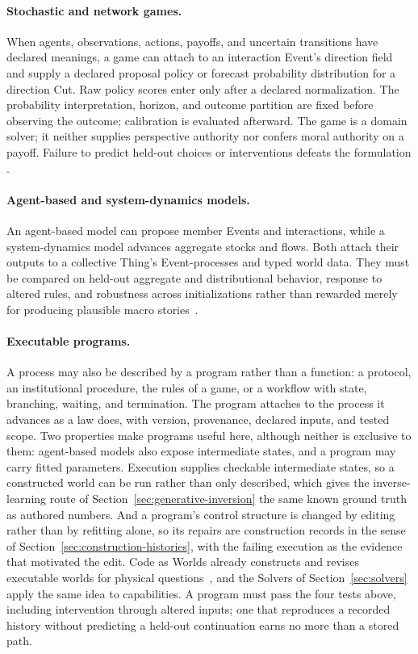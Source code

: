 \documentclass[10pt]{article}
\begin{document}
\paragraph{Stochastic and network games.}
When agents, observations, actions, payoffs, and uncertain transitions have
declared meanings, a game can attach to an interaction Event's direction field
and supply a declared proposal policy or forecast probability distribution for
a direction Cut. Raw policy scores enter only after a declared normalization.
The probability interpretation, horizon, and outcome partition are fixed
before observing the outcome; calibration is evaluated afterward. The game is a domain solver; it neither supplies perspective authority nor confers moral authority on a
payoff. Failure to predict held-out choices or
interventions defeats the formulation
\cite{shapley1953stochastic,hansen2004posg,kearns2001graphical}.

\paragraph{Agent-based and system-dynamics models.}
An agent-based model can propose member Events and interactions, while a
system-dynamics model advances aggregate stocks and flows. Both attach their
outputs to a collective Thing's Event-processes and typed world data. They must be compared on held-out aggregate and
distributional behavior, response to altered rules, and robustness across
initializations rather than rewarded merely for producing plausible macro
stories~\cite{epsteinAxtell1996artificialSocieties,
forrester1961industrialDynamics}.

\paragraph{Executable programs.}
A process may also be described by a program rather than a function: a
protocol, an institutional procedure, the rules of a game, or a workflow with
state, branching, waiting, and termination. The program attaches to the process
it advances as a law does, with version, provenance, declared inputs, and tested
scope. Two properties make programs
useful here, although neither is exclusive to them: agent-based models also
expose intermediate states, and a program may carry fitted parameters.
Execution supplies checkable intermediate states, so a constructed world can be
run rather than only described, which gives the inverse-learning route of
Section~\ref{sec:generative-inversion} the same known ground truth as authored
numbers. And a program's control structure is changed by editing rather than by
refitting alone, so its repairs are construction records in the sense of
Section~\ref{sec:construction-histories}, with the failing execution as the
evidence that motivated the edit. Code as Worlds already constructs and revises
executable worlds for physical questions~\cite{wang2026codeAsWorlds}, and the
Solvers of Section~\ref{sec:solvers} apply the same idea to capabilities. A
program must pass the four tests above, including intervention through altered
inputs; one that reproduces a recorded history without predicting a held-out
continuation earns no more than a stored path.
\end{document}
